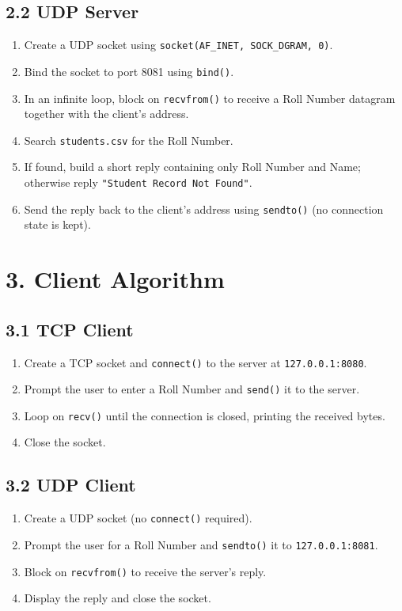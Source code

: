 \documentclass[11pt]{article}
\begin{document}
\subsection*{2.2 UDP Server}
\begin{enumerate}
  \item Create a UDP socket using \texttt{socket(AF\_INET, SOCK\_DGRAM, 0)}.
  \item Bind the socket to port 8081 using \texttt{bind()}.
  \item In an infinite loop, block on \texttt{recvfrom()} to receive a Roll Number datagram
        together with the client's address.
  \item Search \texttt{students.csv} for the Roll Number.
  \item If found, build a short reply containing only Roll Number and Name; otherwise reply
        \texttt{"Student Record Not Found"}.
  \item Send the reply back to the client's address using \texttt{sendto()} (no connection state
        is kept).
\end{enumerate}

\section*{3. Client Algorithm}
\subsection*{3.1 TCP Client}
\begin{enumerate}
  \item Create a TCP socket and \texttt{connect()} to the server at \texttt{127.0.0.1:8080}.
  \item Prompt the user to enter a Roll Number and \texttt{send()} it to the server.
  \item Loop on \texttt{recv()} until the connection is closed, printing the received bytes.
  \item Close the socket.
\end{enumerate}

\subsection*{3.2 UDP Client}
\begin{enumerate}
  \item Create a UDP socket (no \texttt{connect()} required).
  \item Prompt the user for a Roll Number and \texttt{sendto()} it to \texttt{127.0.0.1:8081}.
  \item Block on \texttt{recvfrom()} to receive the server's reply.
  \item Display the reply and close the socket.
\end{enumerate}
\end{document}
